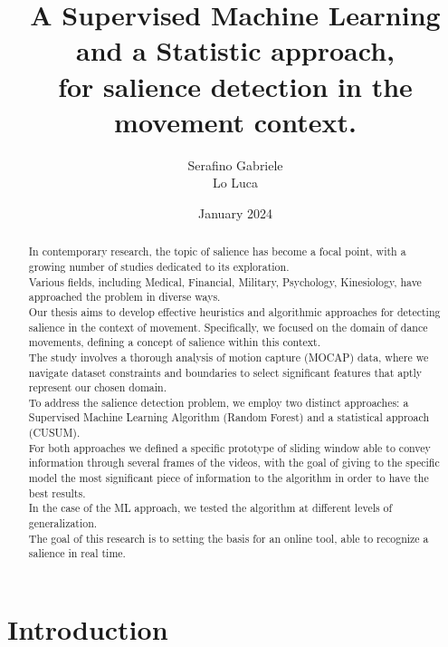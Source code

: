 \documentclass[12pt]{article}
\title{A Supervised Machine Learning\\ and a Statistic approach,\\ for salience detection in the movement context.}
\author{Serafino Gabriele\\ Lo Luca}
\date{January 2024}
\begin{document}
    \maketitle
    
    \newpage
    \begin{abstract}
        In contemporary research, the topic of salience has become a focal point, with a growing number of studies dedicated to its exploration.\\ Various fields, including Medical, Financial, Military, Psychology, Kinesiology,  have approached the problem in diverse ways.\\
        Our thesis aims to develop effective heuristics and algorithmic approaches for detecting salience in the context of movement. Specifically, we focused on the domain of dance movements, defining a concept of salience within this context.\\ 
        The study involves a thorough analysis of motion capture (MOCAP) data, where we navigate dataset constraints and boundaries to select significant features that aptly represent our chosen domain.\\
        To address the salience detection problem, we employ two distinct approaches: a Supervised Machine Learning Algorithm (Random Forest) and a statistical approach (CUSUM).\\
        For both approaches we defined a specific prototype of sliding window able to convey information through several frames of the videos, with the goal of giving to the specific model the most significant piece of information to the algorithm in order to have the best results.\\
        In the case of the ML approach, we tested the algorithm at different levels of generalization.\\
        The goal of this research is to setting the basis for an online tool, able to recognize a salience in real time. 
    \end{abstract} 
        
    \newpage
        
    \tableofcontents
    \newpage
    
    \listoffigures
    \newpage
    
    \listoftables
    \newpage
    \printglossary[type=\acronymtype]
    \newpage
    
        \section{Introduction}
\end{document}
